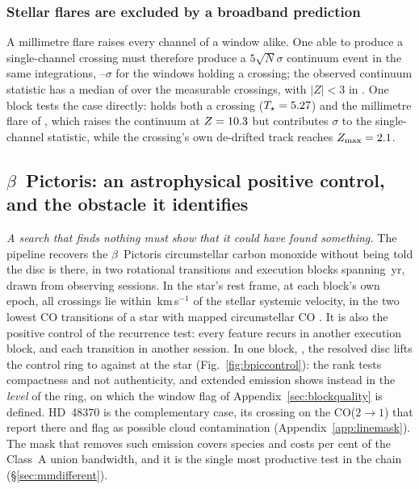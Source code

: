 \subsubsection{Stellar flares are excluded by a broadband prediction}

A millimetre flare raises every channel of a window alike. One able to
produce a single-channel crossing must therefore produce a $5\sqrt{N}\sigma$ continuum
event in the same integrations, \FlPredLo--\FlPredHi$\sigma$ for the windows
holding a crossing; the observed continuum statistic has a median of
\FlObsMed{} over the \FlNCont{} measurable crossings, with $|Z|<3$ in
\FlNQuiet. One block tests the case directly:
\FlEgStar{} \texttt{\FlEgEb} holds both a crossing ($T_\star=5.27$) and the
millimetre flare of \citet{MacGregor2020}, which raises the continuum at
$Z=10.3$ but contributes \FlEgContrib$\sigma$ to the single-channel
statistic, while the crossing's own de-drifted track reaches
$Z_{\max}=2.1$.

\subsection{$\beta$~Pictoris: an astrophysical positive control, and the
obstacle it identifies} \label{sec:bpicval}

\emph{A search that finds nothing must show that it could have found
something.} The pipeline recovers the $\beta$~Pictoris circumstellar carbon
monoxide without being told the disc is there, in two rotational transitions
and \CsBpCoBlocks{} execution blocks spanning \BpBaselineYr\,yr, drawn from
\CsBpCoSess{} observing sessions. In the star's rest frame, at each block's own
epoch, all \BpicPanelNCo{} crossings lie within \BpicDvCoHi\,km\,s$^{-1}$ of the stellar
systemic velocity, in the two lowest CO transitions of a star with mapped
circumstellar CO \citep{Dent2014,Matra2017}. It is also the positive control of the recurrence test: every feature recurs
in another execution block, and each transition in another session.
In one block, \texttt{\BpCtrlBlock}, the resolved disc lifts the control ring
to \BpCtrlRingMax{} against \BpCtrlStar{} at the star
(Fig.~\ref{fig:bpiccontrol}): the rank tests compactness and not
authenticity, and extended emission shows instead in the \emph{level} of the
ring, on which the window flag of Appendix~\ref{sec:blockquality} is
defined.
HD~48370 is the complementary case, its crossing on the CO($2{\to}1$) that
\citet{Cataldi2023} report there and flag as possible cloud contamination
(Appendix~\ref{app:linemask}). The mask that removes such emission covers \FrNSpec{} species and costs
\MkMaskAPct{} per cent of the Class~A union bandwidth, and it is the single
most productive test in the chain (\S\ref{sec:mmdifferent}).


